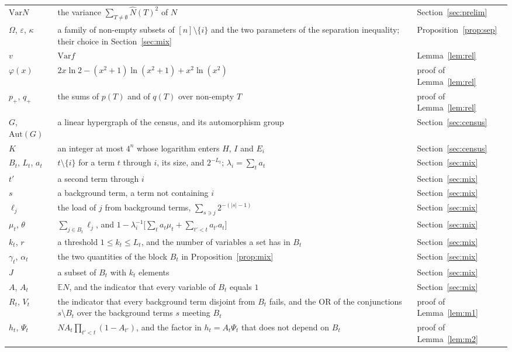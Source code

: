 \documentclass[11pt]{amsart}
\theoremstyle{remark}
\newcommand{\Var}{\mathrm{Var}}
\newcommand{\E}{\mathbb{E}}
\begin{document}
\begin{longtable}{@{}>{\raggedright\arraybackslash}p{}>{\raggedright\arraybackslash}p{}>{\raggedright\arraybackslash}p{}@{}}
$\Var N$ & the variance $\sum_{T\ne\emptyset}\hat N(T)^2$ of $N$ & Section~\ref{sec:prelim} \\
$\Omega$, $\varepsilon$, $\kappa$ & a family of non-empty subsets of $[n]\setminus\{i\}$ and the two parameters of the separation inequality; their choice in Section~\ref{sec:mix} & Proposition~\ref{prop:sep} \\
$v$ & $\Var f$ & Lemma~\ref{lem:rel} \\
$\varphi(x)$ & $2x\ln2-(x^2+1)\ln(x^2+1)+x^2\ln(x^2)$ & proof of Lemma~\ref{lem:rel} \\
$p_+$, $q_+$ & the sums of $p(T)$ and of $q(T)$ over non-empty $T$ & proof of Lemma~\ref{lem:rel} \\
$G$, $\mathrm{Aut}(G)$ & a linear hypergraph of the census, and its automorphism group & Section~\ref{sec:census} \\
$K$ & an integer at most $4^n$ whose logarithm enters $H$, $I$ and $E_i$ & Section~\ref{sec:census} \\
$B_t$, $L_t$, $a_t$ & $t\setminus\{i\}$ for a term $t$ through $i$, its size, and $2^{-L_t}$; $\lambda_i=\sum_ta_t$ & Section~\ref{sec:mix} \\
$t'$ & a second term through $i$ & Section~\ref{sec:mix} \\
$s$ & a background term, a term not containing $i$ & Section~\ref{sec:mix} \\
$\ell_j$ & the load of $j$ from background terms, $\sum_{s\ni j}2^{-(|s|-1)}$ & Section~\ref{sec:mix} \\
$\mu_t$, $\theta$ & $\sum_{j\in B_t}\ell_j$, and $1-\lambda_i^{-1}\bigl[\sum_ta_t\mu_t+\sum_{t'<t}a_{t'}a_t\bigr]$ & Section~\ref{sec:mix} \\
$k_t$, $r$ & a threshold $1\le k_t\le L_t$, and the number of variables a set has in $B_t$ & Section~\ref{sec:mix} \\
$\gamma_t$, $\alpha_t$ & the two quantities of the block $B_t$ in Proposition~\ref{prop:mix} & Section~\ref{sec:mix} \\
$J$ & a subset of $B_t$ with $k_t$ elements & Section~\ref{sec:mix} \\
$A$, $A_t$ & $\E N$, and the indicator that every variable of $B_t$ equals $1$ & Section~\ref{sec:mix} \\
$R_t$, $V_t$ & the indicator that every background term disjoint from $B_t$ fails, and the OR of the conjunctions $s\setminus B_t$ over the background terms $s$ meeting $B_t$ & proof of Lemma~\ref{lem:m1} \\
$h_t$, $\Psi_t$ & $NA_t\prod_{t'<t}(1-A_{t'})$, and the factor in $h_t=A_t\Psi_t$ that does not depend on $B_t$ & proof of Lemma~\ref{lem:m2} \\

\end{longtable}
\end{document}
